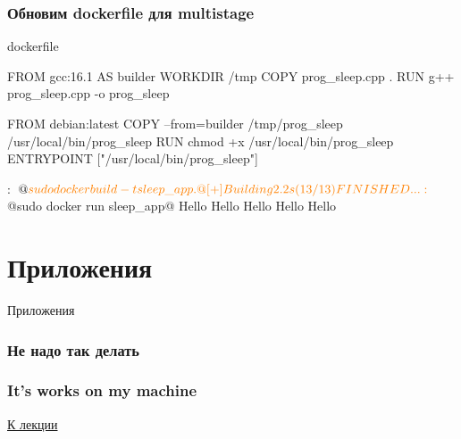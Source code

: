 \documentclass[9pt, aspectratio=1610]{beamer}
\begin{document}
\begin{frame}[fragile=singleslide]\frametitle{Обновим dockerfile для multistage}
	
	\begin{block}{dockerfile}
		\begin{dockerfile}
			FROM gcc:16.1 AS builder
			WORKDIR /tmp
			COPY prog_sleep.cpp .
			RUN g++ prog_sleep.cpp -o prog_sleep
			
			FROM debian:latest
			COPY --from=builder /tmp/prog_sleep /usr/local/bin/prog_sleep
			RUN chmod +x /usr/local/bin/prog_sleep
			ENTRYPOINT ["/usr/local/bin/prog_sleep"]
		\end{dockerfile}
	\end{block}
	

	
	\begin{cmdcode}
		:~$ @\color{orange}sudo docker build -t sleep\_app .@
		[+] Building 2.2s (13/13) FINISHED                                                                                                    ...
	
		:~$ @\color{orange}sudo docker run sleep\_app@
		Hello
		Hello
		Hello
		Hello
		Hello
	\end{cmdcode}
\end{frame}

\section*{Приложения}




\begin{frame}
	
\hfill\Huge Приложения \hfill {}	
	
\end{frame}


\begin{frame}\frametitle{Не надо так делать}\label{f:electro}
	\centering
	
	\hfill\hyperlink{ref:toelectro}{\color{cyan}{К лекции}}
\end{frame}

\begin{frame}\frametitle{It's works on my machine}\label{f:iwomm}

\centering%
\hspace{3pt}%
\hspace{3pt}%

\hfill\hyperlink{ref:tomemes}{\color{cyan}К лекции}

	
\end{frame}





	
\end{document}

